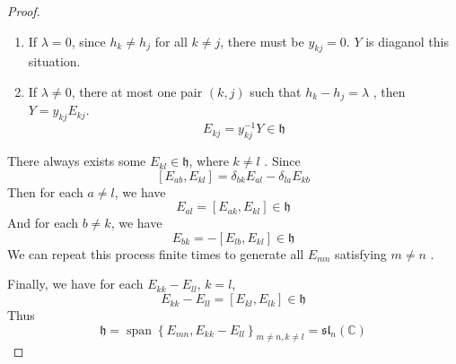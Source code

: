 \documentclass[../main.tex]{subfiles}
\begin{document}
\begin{proof}
\begin{itemize}
            \begin{enumerate}
                \item If \(   \lambda = 0  \), since \(  h_{k}\neq h_{j}  \) for all \(  k\neq j  \), there must be \(  y_{kj}= 0  \). \(  Y  \) is diaganol this situation.     
                \item If \(   \lambda \neq 0  \), there at most one pair \(  \left( k,j \right)   \) such that \(  h_{k}-h_{j}=  \lambda   \)  , then \(  Y= y_{kj}E_{kj}  \). \[
                E_{kj}= y_{kj}^{-1} Y\in \mathfrak{h}
                \]  
            \end{enumerate}
            
    \end{itemize}
    There always exists some \(  E_{kl} \in \mathfrak{h}  \), where \(  k\neq l  \) .   Since \[
    \left[ E_{ab},E_{kl} \right]=   \delta _{bk}E_{al}-  \delta _{la}E_{kb}
    \] Then for each \(  a\neq l  \), we have \[
    E_{al}= \left[ E_{ak},E_{kl} \right]\in \mathfrak{h} 
    \] And for each \(  b \neq k  \), we have \[
    E_{bk}= -\left[ E_{lb},E_{kl} \right]\in \mathfrak{h} 
    \]  We can repeat this process finite times to generate all \(  E_{mn}  \) satisfying \(  m\neq n  \) .  

    Finally, we have for each \(  E_{kk}-E_{l l }  \), \(  k = l  \), \[
    E_{k k }-E_{l l }= \left[ E_{kl},E_{lk} \right] \in \mathfrak{h}
    \]   Thus \[
    \mathfrak{h}= \operatorname{span}\left\{ E_{mn}, E_{kk}-E_{ll} \right\}_{m\neq n,k \neq l}= \mathfrak{sl}_{n}\left( \mathbb{C}  \right) 
    \]
\end{proof}
\end{document}
